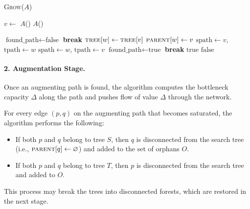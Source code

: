 \begin{algorithm}[H]
\caption{\textsc{Grow($A$)}}
\begin{algorithmic}[1]
    \State $v \gets$ $A$()
    \State $A$()

    \State $\text{found\_path} \gets \text{false}$
            \State \textbf{break}
        \EndIf
                \State $\textsc{tree}[w] \gets \textsc{tree}[v]$
                \State $\textsc{parent}[w] \gets v$
                \State {}
                    \State $\text{spath} \gets v$, $\text{tpath} \gets w$ 
                \Else
                    \State $\text{spath} \gets w$, $\text{tpath} \gets v$
                \EndIf
                \State $\text{found\_path} \gets \text{true}$
                \State {}
                \State \textbf{break}
            \EndIf
        \EndIf
    \EndFor
        \State \Return $\text{true}$
    \EndIf
\EndWhile
\State \Return $\text{false}$
\end{algorithmic}
\end{algorithm}

\paragraph*{2. Augmentation Stage.}  
Once an augmenting path is found, the algorithm computes the bottleneck capacity $\Delta$ along the path and pushes flow of value $\Delta$ through the network.

For every edge $(p, q)$ on the augmenting path that becomes saturated, the algorithm performs the following:
\begin{itemize}
    \item If both $p$ and $q$ belong to tree $S$, then $q$ is disconnected from the search tree (i.e., $\textsc{parent}[q] \gets \varnothing$) and added to the set of orphans $O$.
    \item If both $p$ and $q$ belong to tree $T$, then $p$ is disconnected from the search tree and added to $O$.
\end{itemize}

This process may break the trees into disconnected forests, which are restored in the next stage.

